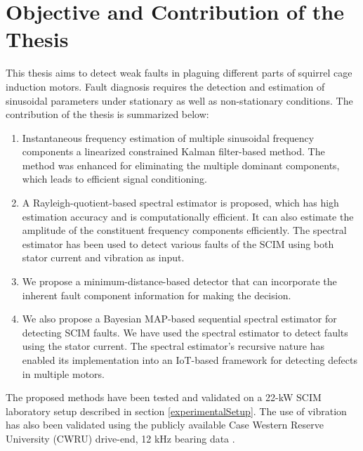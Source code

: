 \section{Objective and Contribution of the Thesis}
This thesis aims to detect weak faults in plaguing different parts of squirrel cage induction motors. Fault diagnosis requires the detection and estimation of sinusoidal parameters under stationary as well as non-stationary conditions. The contribution of the thesis is summarized below:
\begin{enumerate}
	\renewcommand{\theenumi}{\roman{enumi}}
	\item Instantaneous frequency estimation of multiple sinusoidal frequency components a linearized constrained Kalman filter-based method. The method was enhanced for eliminating the multiple dominant components, which leads to efficient signal conditioning. 
	\item A Rayleigh-quotient-based spectral estimator is proposed, which has high estimation accuracy and is computationally efficient. It can also estimate the amplitude of the constituent frequency components efficiently. The spectral estimator has been used to detect various faults of the SCIM using both stator current and vibration as input.
	\item We propose a minimum-distance-based detector that can incorporate the inherent fault component information for making the decision.
	\item We also propose a Bayesian MAP-based sequential spectral estimator for detecting SCIM faults. We have used the spectral estimator to detect faults using the stator current. The spectral estimator's recursive nature has enabled its implementation into an IoT-based framework for detecting defects in multiple motors. 
\end{enumerate}
The proposed methods have been tested and validated on a 22-kW SCIM laboratory setup described in section \ref{experimentalSetup}. The use of vibration has also been validated using the publicly available Case Western Reserve University (CWRU) drive-end, 12 kHz bearing data \cite{caseWestern}.
